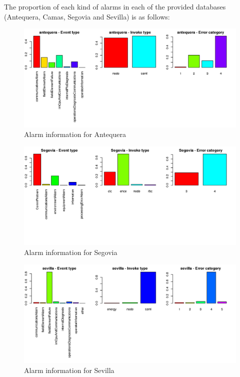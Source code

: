 \documentclass[a4paper,12pt]{article}
\begin{document}
The proportion of each kind of alarms in each of the provided databases (Antequera, Camas, Segovia and Sevilla) is as follows:
\begin{figure}[ht!]
 \centering
 \includegraphics[width=\textwidth]{./img/antequera_graph.png}
 \caption{Alarm information for Antequera}
 \label{fig:anteq}
\end{figure}
\begin{figure}[ht!]
 \centering
 \includegraphics[width=\textwidth]{./img/segovia_graph.png}
 \caption{Alarm information for Segovia}
 \label{fig:segovia}
\end{figure}
\begin{figure}[ht!]
 \centering
 \includegraphics[width=\textwidth]{./img/sevilla_graph.png}
 \caption{Alarm information for Sevilla}
 \label{fig:sevilla}
\end{figure}
\end{document}

